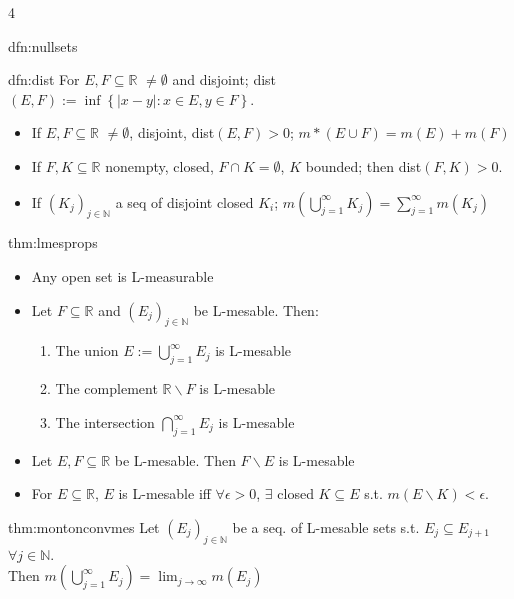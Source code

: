 \documentclass[landscape, 8pt]{extarticle}
\begin{document}
\begin{multicols*}{4}
\begin{dfn}{dfn:nullsets}{ }
		\end{dfn}
		
		
		\begin{dfn}{dfn:dist}{ }
			For $E, F \subseteq \mathbb{R}$ $\ne \emptyset$ and disjoint; dist$(E, F) := \inf\left\{\left|x-y\right|: x\in E, y\in F\right\}$.
			\begin{itemize}
				\item If $E, F \subseteq \mathbb{R}$ $\ne \emptyset$, disjoint, dist$(E, F) > 0$; $m*(E \cup F) = m(E) + m(F)$
				\item If $F, K \subseteq \mathbb{R}$ nonempty, closed, $F \cap K = \emptyset$, $K$ bounded; then dist$(F, K) > 0$.
				\item If $(K_j)_{j\in \mathbb{N}}$ a seq of disjoint closed $K_i$; $m\left(\bigcup_{j=1}^\infty K_j\right) = \sum_{j=1}^{\infty}m(K_j)$
			\end{itemize}
			
		\end{dfn}
		
		
		\begin{thm}{thm:lmesprops}{ }
			\begin{itemize}
				\item Any open set is L-measurable
				\item Let $F \subseteq \mathbb{R}$ and $(E_j)_{j\in \mathbb{N}}$ be L-mesable. Then:
					\begin{enumerate}[label=(\arabic*)]
						\item The union $E := \bigcup_{j=1}^\infty E_j$ is L-mesable
						\item The complement $\mathbb{R} \backslash F$ is L-mesable
						\item The intersection $\bigcap_{j=1}^\infty E_j$ is L-mesable
					\end{enumerate}
				\item Let $E, F \subseteq \mathbb{R}$ be L-mesable. Then $F \backslash E$ is L-mesable
				\item For $E \subseteq \mathbb{R}$, $E$ is L-mesable iff $\forall \epsilon > 0$, $\exists$ closed $K \subseteq E$ s.t. $m(E \backslash K) <\epsilon$.
			\end{itemize}
			
		\end{thm}
		
		
		\begin{thm}{thm:montonconvmes}{ }
			Let $(E_j)_{j\in \mathbb{N}}$ be a seq. of L-mesable sets s.t. $E_j \subseteq E_{j+1}$ $\forall j\in \mathbb{N}$. \\
			Then $m\left(\bigcup_{j=1}^\infty E_j\right) = \lim_{j\to \infty}m(E_j)$
			

\end{thm}
\end{multicols*}
\end{document}
